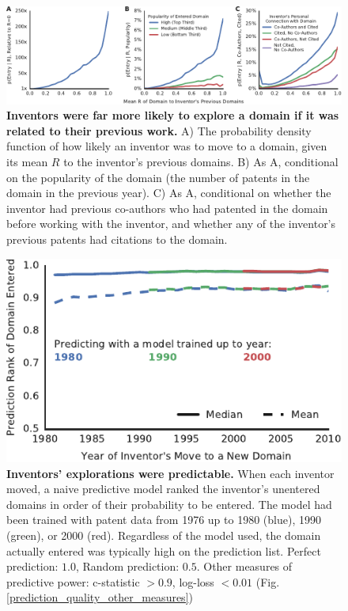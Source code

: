 \documentclass{dsj}
\begin{document}
\begin{figure}
\includegraphics[width=1.3\textwidth]{figs/R_pdf_horizontal.pdf}
\caption{\textbf{Inventors were far more likely to explore a domain if it was related to their previous work.}
A) The probability density function of how likely an inventor was to move to a domain, given its mean $R$ to the inventor's previous domains.
B) As A, conditional on the popularity of the domain (the number of patents in the domain in the previous year).
C) As A, conditional on whether the inventor had previous co-authors who had patented in the domain before working with the inventor, and whether any of the inventor's previous patents had citations to the domain.
}\label{R_pdf}
\end{figure}


\begin{figure}[]
\begin{center}
\includegraphics[width=\columnwidth]{figs/prediction_ranks.pdf}
\end{center}
\caption{\textbf{Inventors' explorations were predictable.} When each inventor moved, a naive predictive model ranked the inventor's unentered domains in order of their probability to be entered. The model had been trained with patent data from 1976 up to 1980 (blue), 1990 (green), or 2000 (red). Regardless of the model used, the domain actually entered was typically high on the prediction list. Perfect prediction: $1.0$,  Random prediction: $0.5$. Other measures of predictive power: c-statistic $>0.9$, log-loss $<0.01$ (Fig. \ref{prediction_quality_other_measures})
}\label{prediction_ranks}
\end{figure}
\end{document}
